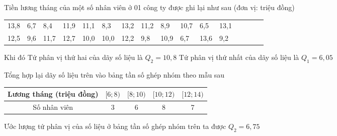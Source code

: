 \begin{ex}%
 Tiền lương tháng của một số nhân viên ở 01 công ty được  ghi lại như sau (đơn vị: triệu đồng)
 \begin{center}
  \begin{tabular}{llllllllllllllll}
   13{,}8 & 6{,}7 & 8{,}4 & 11{,}9 & 11{,}1 & 8{,}3 &  13{,}2 & 11{,}2 &
   8{,}9 & 10{,}7 & 6{,}5 &  13{,}1 & \\
   12{,}5 & 9{,}6 & 11{,}7 & 12{,}7 & 10{,}0 & 10{,}0  & 12{,}2 & 9{,}8 &
   10{,}9 & 6{,}7 & 13{,}6  & 9{,}2 & \\
  \end{tabular}
 \end{center}
  Khi đó
  \choiceTF
  {\True Tứ phân  vị thứ hai của dãy số liệu là $Q_2=10{,}8$}
  {Tứ phân vị thứ nhất của dãy số liệu là  $Q_1=6{,}05$}
  {\True Tổng hợp lại  dãy số liệu trên vào bảng tần số ghép nhóm theo mẫu sau
  \begin{tabular}{|c|c|c|c|c|}
   \hline 
   Lương tháng (triệu đồng) & $[6; 8)$ & $[8;10)$ & $[10; 12)$  & $[12;14)$\\
    \hline
   Số nhân viên & 3 & 6 & 8 & 7 \\ 
    \hline
 \end{tabular}}
  {Ước lượng tứ phân vị của số liệu ở bảng tần số ghép nhóm trên ta được $Q_2=6{,}75$}
\end{ex}
